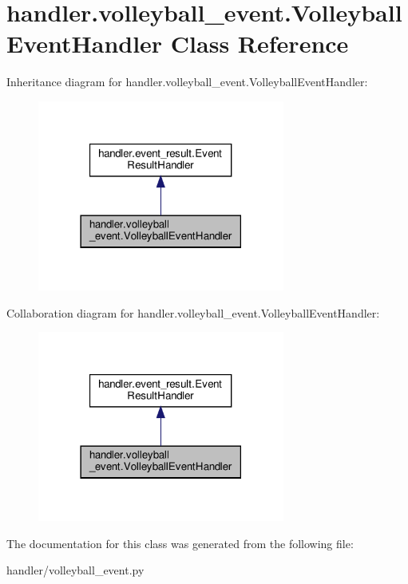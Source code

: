 \hypertarget{classhandler_1_1volleyball__event_1_1_volleyball_event_handler}{}\section{handler.\+volleyball\+\_\+event.\+Volleyball\+Event\+Handler Class Reference}
\label{classhandler_1_1volleyball__event_1_1_volleyball_event_handler}


Inheritance diagram for handler.\+volleyball\+\_\+event.\+Volleyball\+Event\+Handler\+:\nopagebreak
\begin{figure}[H]
\begin{center}
\leavevmode
\includegraphics[width=230pt]{classhandler_1_1volleyball__event_1_1_volleyball_event_handler__inherit__graph}
\end{center}
\end{figure}


Collaboration diagram for handler.\+volleyball\+\_\+event.\+Volleyball\+Event\+Handler\+:\nopagebreak
\begin{figure}[H]
\begin{center}
\leavevmode
\includegraphics[width=230pt]{classhandler_1_1volleyball__event_1_1_volleyball_event_handler__coll__graph}
\end{center}
\end{figure}


The documentation for this class was generated from the following file\+:\begin{DoxyCompactItemize}
\item 
handler/volleyball\+\_\+event.\+py\end{DoxyCompactItemize}

